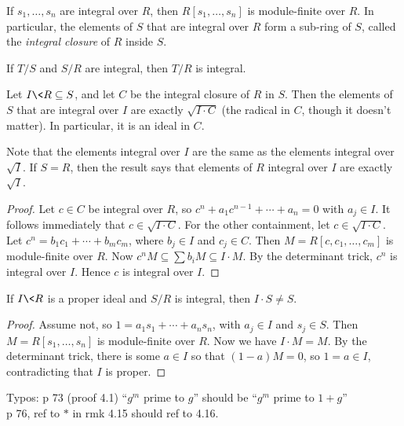  \begin{corollary}
   If $s_1,\dots, s_n$ are integral over $R$, then $R[s_1,\dots, s_n]$ is module-finite
   over $R$. In particular, the elements of $S$ that are integral over $R$ form a
   sub-ring of $S$, called the \emph{integral closure} of $R$ inside $S$.
 \end{corollary}
 \begin{corollary}
   If $T/S$ and $S/R$ are integral, then $T/R$ is integral.
 \end{corollary}
 \begin{proposition}
   Let $I\< R\subseteq S$, and let $C$ be the integral closure of $R$ in $S$. Then the
   elements of $S$ that are integral over $I$ are exactly $\sqrt{I\cdot C}$ (the radical
   in $C$, though it doesn't matter). In particular, it is an ideal in $C$.
 \end{proposition}
 \begin{remark}
   Note that the elements integral over $I$ are the same as the elements integral over
   $\sqrt I$. If $S=R$, then the result says that elements of $R$ integral over $I$ are
   exactly $\sqrt I$.
 \end{remark}
 \begin{proof}
   Let $c\in C$ be integral over $R$, so $c^n+a_1c^{n-1}+\cdots +a_n=0$ with $a_j\in I$.
   It follows immediately that $c\in \sqrt {I\cdot C}$. For the other containment, let
   $c\in \sqrt {I\cdot C}$. Let $c^n=b_1c_1+\cdots + b_mc_m$, where $b_j\in I$ and
   $c_j\in C$. Then $M=R[c,c_1,\dots, c_m]$ is module-finite over $R$. Now $c^nM\subseteq
   \sum b_iM\subseteq I\cdot M$. By the determinant trick, $c^n$ is integral over $I$.
   Hence $c$ is integral over $I$.
 \end{proof}
 \begin{lemma}
   If $I\< R$ is a proper ideal and $S/R$ is integral, then $I\cdot S\neq S$.
 \end{lemma}
 \begin{proof}
   Assume not, so $1=a_1s_1+\cdots+a_ns_n$, with $a_j\in I$ and $s_j\in S$. Then
   $M=R[s_1,\dots, s_n]$ is module-finite over $R$. Now we have $I\cdot M=M$. By the
   determinant trick, there is some $a\in I$ so that $(1-a)M=0$, so $1=a\in I$,
   contradicting that $I$ is proper.
 \end{proof}
 \setcounter{lecture}{24}

 Typos: p 73 (proof 4.1) ``$g^m$ prime to $g$'' should be ``$g^m$ prime to $1+g$''\\
 p 76, ref to $\ast$ in rmk 4.15 should ref to 4.16.

